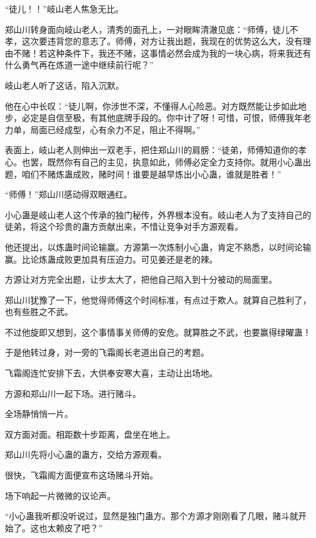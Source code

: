 
\begin{this_body}

“徒儿！！”岐山老人焦急无比。

郑山川转身面向岐山老人，清秀的面孔上，一对眼眸清澈见底：“师傅，徒儿不孝，这次要违背您的意志了。师傅，对方让我出题，我现在的优势这么大，没有理由不赌！若这种条件下，我还不赌，这事情必然会成为我的一块心病，将来我还有什么勇气再在炼道一途中继续前行呢？”

岐山老人听了这话，陷入沉默。

他在心中长叹：“徒儿啊，你涉世不深，不懂得人心险恶。对方既然能让步如此地步，必定是自信至极，有其他底牌手段的。你中计了呀！可惜，可恨，师傅我年老力单，局面已经成型，心有余力不足，阻止不得啊。”

表面上，岐山老人则伸出一双老手，把住郑山川的肩膀：“徒弟，师傅知道你的孝心。也罢，既然你有自己的主见，执意如此，师傅必定全力支持你。就用小心蛊出题，咱们不赌炼蛊成败，赌时间！谁要是越早炼出小心蛊，谁就是胜者！”

“师傅！”郑山川感动得双眼通红。

小心蛊是岐山老人这个传承的独门秘传，外界根本没有。岐山老人为了支持自己的徒弟，将这个珍贵的蛊方贡献出来，不惜让竞争对手方源观看。

他还提出，以炼蛊时间论输赢。方源第一次炼制小心蛊，肯定不熟悉，以时间论输赢。比论炼蛊成败更加具有压迫力。可见姜还是老的辣。

方源让对方完全出题，让步太大了，把他自己陷入到十分被动的局面里。

郑山川犹豫了一下，他觉得师傅这个时间标准，有点过于欺人。就算自己胜利了，也有些胜之不武。

不过他旋即又想到，这个事情事关师傅的安危。就算胜之不武，也要赢得绿曜蛊！

于是他转过身，对一旁的飞霜阁长老道出自己的考题。

飞霜阁连忙安排下去，大供奉安寒大喜，主动让出场地。

方源和郑山川一起下场。进行赌斗。

全场静悄悄一片。

双方面对面。相距数十步距离，盘坐在地上。

郑山川先将小心蛊的蛊方，交给方源观看。

很快，飞霜阁方面便宣布这场赌斗开始。

场下响起一片微微的议论声。

“小心蛊我听都没听说过，显然是独门蛊方。那个方源才刚刚看了几眼，赌斗就开始了。这也太赖皮了吧？”


\end{this_body}
